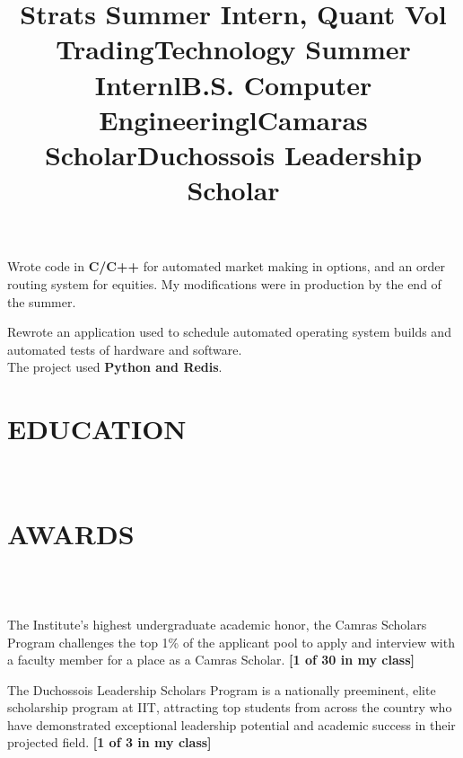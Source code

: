 \documentclass{res}
\begin{document}
\begin{resume}
\title{\bf Strats Summer Intern, Quant Vol Trading}
\begin{position}
     Wrote code in {\bf C/C++} for automated market making in options, and an order routing system for equities. My modifications were in production by the end of the summer.
\end{position}

\title{\bf Technology Summer Intern}
\begin{position}
     Rewrote an application used to schedule automated operating system builds and automated tests of hardware and software.\\
     The project used {\bf Python and Redis}.
\end{position}

\section{EDUCATION}

\begin{format}
  \title{l}  \\
\end{format}
\title{B.S. Computer Engineering}
\begin{position}
\end{position}

\section{AWARDS}
\begin{format}
  \title{l} \\
  \body\\
\end{format}
\title{\bf Camaras Scholar}
\dates{}
\begin{position}
        The Institute's highest undergraduate academic honor, the Camras Scholars Program challenges the top 1\% of the applicant pool to apply and interview with a faculty member for a place as a Camras Scholar. {\bf [1 of 30 in my class]}
\end{position}

\title{{\bf Duchossois Leadership Scholar}}
\begin{position}
  The Duchossois Leadership Scholars Program is a nationally preeminent, elite scholarship program at IIT, attracting top students from across the country who have demonstrated exceptional leadership potential and academic success in their projected field. {\bf [1 of 3 in my class]}
\end{position}
 

\end{resume}
\end{document}
